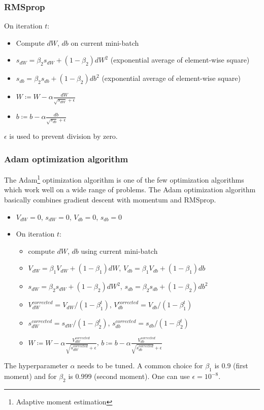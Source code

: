 \documentclass{article}
\begin{document}
\subsubsection{RMSprop}
On iteration $t$:
\begin{itemize}
  \item Compute $dW$, $db$ on current mini-batch
  \item $s_{dW}=\beta_2 s_{dW}+(1-\beta_2)dW^2$ (exponential average of element-wise square)
  \item $s_{db}=\beta_2 s_{db}+(1-\beta_2)db^2$ (exponential average of element-wise square)
  \item $W\coloneqq W-\alpha\frac{dW}{\sqrt{s_{dW}}+\epsilon}$
  \item $b\coloneqq b-\alpha\frac{db}{\sqrt{s_{db}}+\epsilon}$
\end{itemize}
$\epsilon$ is used to prevent division by zero.

\subsubsection{Adam optimization algorithm}
The Adam\footnote{Adaptive moment estimation} optimization algorithm is one of the few optimization algorithms
which work well on a wide range of problems.
The Adam optimization algorithm basically combines gradient descent with momentum and RMSprop.
\begin{itemize}
  \item $V_{dW}=0$, $s_{dW}=0$, $V_{db}=0$, $s_{db}=0$
  \item On iteration $t$:
    \begin{itemize}
      \item compute $dW$, $db$ using current mini-batch
      \item $V_{dW}=\beta_1 V_{dW}+(1-\beta_1)dW$, $V_{db}=\beta_1 V_{db}+(1-\beta_1)db$
      \item $s_{dW}=\beta_2 s_{dW}+(1-\beta_2)dW^2$, $s_{db}=\beta_2 s_{db}+(1-\beta_2)db^2$
      \item $V_{dW}^{corrected}=V_{dW}/(1-\beta_1^t)$, $V_{db}^{corrected}=V_{db}/(1-\beta_1^t)$
      \item $s_{dW}^{corrected}=s_{dW}/(1-\beta_2^t)$, $s_{db}^{corrected}=s_{db}/(1-\beta_2^t)$
      \item $W\coloneqq W-\alpha\frac{V_{dW}^{corrected}}{\sqrt{s_{dW}^{corrected}}+\epsilon}$,
        $b\coloneqq b-\alpha\frac{V_{db}^{corrected}}{\sqrt{s_{db}^{corrected}}+\epsilon}$
    \end{itemize}
\end{itemize}
The hyperparameter $\alpha$ needs to be tuned.
A common choice for $\beta_1$ is $0.9$ (first moment) and for $\beta_2$ is $0.999$ (second moment).
One can use $\epsilon=10^{-8}$.
\end{document}
